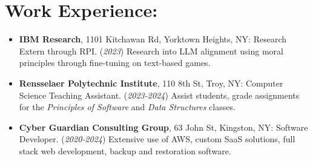 \documentclass[12pt]{article}
\begin{document}
\section*{Work Experience:}
\begin{itemize}
    \itemsep0em 
    \item \textbf{IBM Research}, 1101 Kitchawan Rd, Yorktown Heights, NY: Research Extern through RPI. (\textit{2023}) Research into LLM alignment using moral principles through fine-tuning on text-based games.
    
    \item \textbf{Rensselaer Polytechnic Institute}, 110 8th St, Troy, NY: Computer Science Teaching Assistant. (\textit{2023-2024}) Assist students, grade assignments for the \textit{Principles of Software} and \textit{Data Structures} classes.
    
    \item \textbf{Cyber Guardian Consulting Group}, 63 John St, Kingston, NY: Software Developer. (\textit{2020-2024}) Extensive use of AWS, custom SaaS solutions, full stack web development, backup and restoration software.

\end{itemize}
\end{document}
